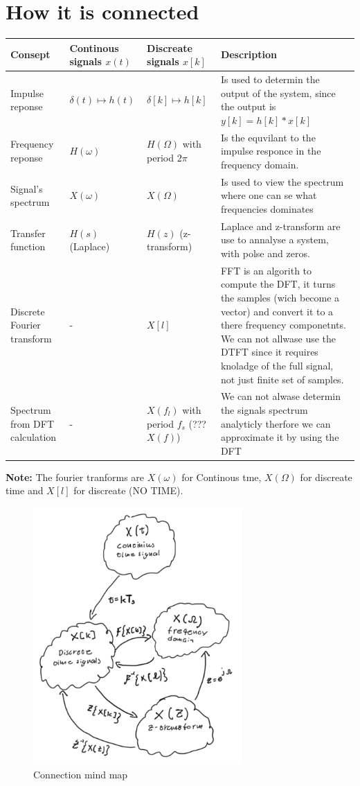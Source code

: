 \documentclass{article}
\begin{document}


\newpage
\section{How it is connected}
\begin{tabular}{|m{2cm}|m{3cm}|m{4cm}|m{6cm}|}
    \hline
    Consept & Continous signals $x(t)$ & Discreate signals $x[k]$ & Description \\
    \hline
    \hline
    Impulse reponse & $\delta(t) \mapsto h(t)$ & $\delta[k] \mapsto h[k]$ & Is used to determin the output of the system, since the output is $y[k]=h[k]*x[k]$ \\
    \hline
    Frequency reponse & $H(\omega)$ & $H(\Omega)$ with period $2\pi$ & Is the equvilant to the impulse responce in the frequency domain. \\
    \hline
    Signal's spectrum & $X(\omega)$ & $X(\Omega)$ & Is used to view the spectrum where one can se what frequencies dominates \\
    \hline
    Transfer function & $H(s)$ (Laplace) & $H(z)$ (z-transform) & Laplace and z-transform are use to annalyse a system, with polse and zeros. \\
    \hline
    Discrete Fourier transform & - & $X[l]$ & FFT is an algorith to compute the DFT, it turns the samples (wich become a vector) and convert it to a there frequency componetnts. We can not allwase use the DTFT since it requires knoladge of the full signal, not just finite set of samples. \\
    \hline
    Spectrum from DFT calculation & - & $X(f_l)$ with period $f_s$ (???$X(f)$) & We can not alwase determin the signals spectrum analyticly therfore we can approximate it by using the DFT \\
    \hline
\end{tabular}
\textbf{Note:} The fourier tranforms are $X(\omega)$ for Continous tme, $X(\Omega)$ for discreate time and 
$X[l]$ for discreate (NO TIME).  

\begin{figure}[!h]
   \centering
   \includegraphics[width=8cm]{image/connection_mind-map.pdf} 
   \caption{Connection mind map}
   \label{fig:connection_mind-map}
\end{figure}
\end{document}
